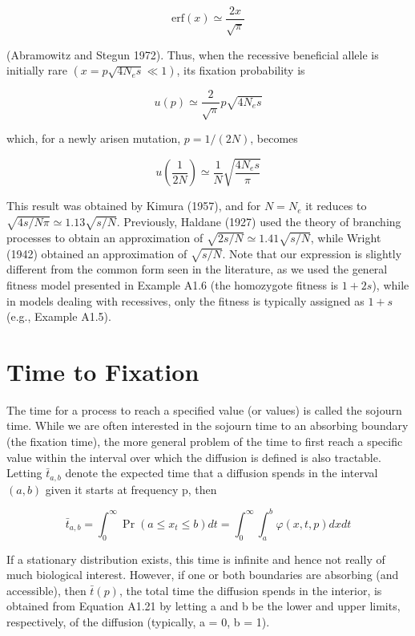 \documentclass{article}
\begin{document}
\begin{equation}
\mathrm{erf}(x)\simeq\frac{2x}{\sqrt{\pi}}
\end{equation}

(Abramowitz and Stegun 1972). Thus, when the recessive beneficial allele is initially rare  $ (x = p \sqrt{4N_e s} \ll 1) $, its fixation probability is

\begin{equation}
u(p)\simeq\frac{2}{\sqrt{\pi}}p\sqrt{4N_{e}s}
\end{equation}

which, for a newly arisen mutation,  $  p = 1/(2N)  $, becomes

\begin{equation}
u\left(\frac{1}{2N}\right)\simeq\frac{1}{N}\sqrt{\frac{4N_{e}s}{\pi}}
\end{equation}

This result was obtained by Kimura (1957), and for  $ N = N_e $ it reduces to  $ \sqrt{4s/N\pi} \simeq 1.13\sqrt{s/N} $. Previously, Haldane (1927) used the theory of branching processes to obtain an approximation of  $ \sqrt{2s/N} \simeq 1.41\sqrt{s/N} $, while Wright (1942) obtained an approximation of  $ \sqrt{s/N} $. Note that our expression is slightly different from the common form seen in the literature, as we used the general fitness model presented in Example A1.6 (the homozygote fitness is  $ 1 + 2s $), while in models dealing with recessives, only the fitness is typically assigned as  $ 1 + s $ (e.g., Example A1.5).

\section{Time to Fixation}
The time for a process to reach a specified value (or values) is called the sojourn time. While we are often interested in the sojourn time to an absorbing boundary (the fixation time), the more general problem of the time to first reach a specific value within the interval over which the diffusion is defined is also tractable. Letting  $ \bar{t}_{a,b} $ denote the expected time that a diffusion spends in the interval  $ (a,b) $ given it starts at frequency p, then

\begin{equation}
\bar{t}_{a,b}=\int_{0}^{\infty}\Pr\left(a\leq x_{t}\leq b\right)dt=\int_{0}^{\infty}\int_{a}^{b}\varphi(x,t,p)dx dt
\end{equation}

If a stationary distribution exists, this time is infinite and hence not really of much biological interest. However, if one or both boundaries are absorbing (and accessible), then  $ \bar{t}(p) $, the total time the diffusion spends in the interior, is obtained from Equation A1.21 by letting a and b be the lower and upper limits, respectively, of the diffusion (typically, a = 0, b = 1).
\end{document}
